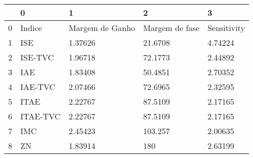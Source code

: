 \begin{tabular}{lllll}
\toprule
{} &         0 &                1 &               2 &            3 \\
\midrule
0 &    Indice &  Margem de Ganho &  Margem de fase &  Sensitivity \\
1 &       ISE &          1.37626 &         21.6708 &      4.74224 \\
2 &   ISE-TVC &          1.96718 &         72.1773 &      2.44892 \\
3 &       IAE &          1.83408 &         50.4851 &      2.70352 \\
4 &   IAE-TVC &          2.07466 &         72.6965 &      2.32595 \\
5 &      ITAE &          2.22767 &         87.5109 &      2.17165 \\
6 &  ITAE-TVC &          2.22767 &         87.5109 &      2.17165 \\
7 &       IMC &          2.45423 &         103.257 &      2.00635 \\
8 &        ZN &          1.83914 &             180 &      2.63199 \\
\bottomrule
\end{tabular}
